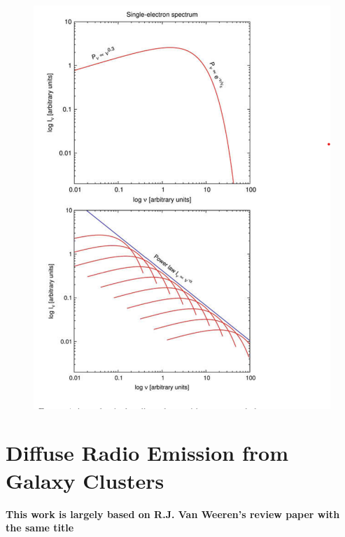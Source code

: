 \documentclass[11pt]{report}
\begin{document}
\begin{figure}\label{figsyn}
\includegraphics[scale=1]{figsyn.png}
\end{figure}
\chapter{Diffuse Radio Emission from Galaxy Clusters}
\textbf{This work is largely based on R.J.  Van Weeren's review paper with the same title}
\end{document}
